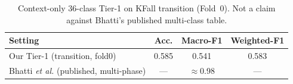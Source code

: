\begin{table}[!t]
\centering
\caption{Context-only 36-class Tier-1 on KFall transition (Fold~0). Not a claim against Bhatti's published multi-class table.}
\label{tab:kfallmc}
\begin{tabular}{lccc}
\toprule
Setting & Acc. & Macro-F1 & Weighted-F1 \\
\midrule
Our Tier-1 (transition, fold0) & 0.585 & 0.541 & 0.583 \\
Bhatti \textit{et al.} (published, multi-phase) & --- & $\approx$0.98 & --- \\
\bottomrule
\end{tabular}
\end{table}
